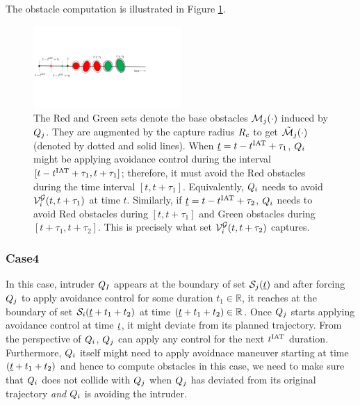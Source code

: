 The obstacle computation is illustrated in Figure \ref{fig:obsCase3}.
\begin{figure}[H]
  \centering
  \includegraphics[width=0.5\textwidth]{"figs/obsCase3"}
  \caption{The Red and Green sets denote the base obstacles $\mathcal{M}_j(\cdot)$ induced by $Q_j$. They are augmented by the capture radius $R_c$ to get $\tilde{\mathcal{M}}_j(\cdot)$ (denoted by dotted and solid lines). When $\underline{t} = t - t^\text{IAT} + \tau_1$, $Q_i$ might be applying avoidance control during the interval $[t - t^\text{IAT} + \tau_1, t + \tau_1]$; therefore, it must avoid the Red obstacles during the time interval $[t, t + \tau_1]$. Equivalently, $Q_i$ needs to avoid $\mathcal{V}^{\mathcal{G}}_{i}(t, t+\tau_1)$ at time $t$. Similarly, if $\underline{t} = t - t^\text{IAT} + \tau_2$, $Q_i$ needs to avoid Red obstacles during $[t, t + \tau_1]$ and Green obstacles during $[t + \tau_1, t + \tau_2]$. This is precisely what set $\mathcal{V}^{\mathcal{G}}_{i}(t, t+\tau_2)$ captures.}
  \label{fig:obsCase3}
\end{figure}

\subsubsection{Case4} \label{sec:intruderObs_case4}
In this case, intruder $Q_{I}$ appears at the boundary of set $\mathcal{S}_j(\underline{t})$ and after forcing $Q_j$ to apply avoidance control for some duration $t_1 \in \mathbb{R}$, it reaches at the boundary of set $\mathcal{S}_i(\underline{t} + t_1 + t_2)$ at time $(\underline{t} + t_1 + t_2) \in \mathbb{R}$. Once $Q_j$ starts applying avoidance control at time $\underline{t}$, it might deviate from its planned trajectory. From the perspective of $Q_i$, $Q_j$ can apply any control for the next $t^\text{IAT}$ duration. Furthermore, $Q_i$ itself might need to apply avoidnace maneuver starting at time $(\underline{t} + t_1 + t_2)$ and hence to compute obstacles in this case, we need to make sure that $Q_i$ does not collide with $Q_j$ when $Q_j$ has deviated from its original trajectory \textit{and} $Q_i$ is avoiding the intruder.   

